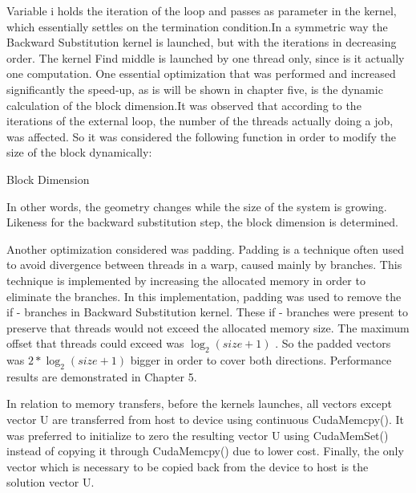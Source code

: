 Variable i holds the iteration of the loop and passes as parameter in the kernel, which essentially settles on the termination condition.In a symmetric way the  Backward Substitution kernel is launched, but with the iterations in decreasing order.
The kernel Find middle is launched by one thread only, since is it actually one computation.
One essential optimization that was performed and increased significantly the speed-up, as is will be shown in chapter five, is the dynamic calculation of the block dimension.It was observed that according to the iterations of the external loop, the number of the threads actually doing a job, was affected. So it was considered the following function in order to modify the size of the block dynamically:
\begin{algorithm}[H]
\begin{algorithmic}[1]
\EndFunction
\end{algorithmic}
\caption{Block Dimension}
\label{alg:calc_dim}
\end{algorithm}
In other words, the geometry changes while the size of the system is growing. 
Likeness for the backward substitution step, the block dimension is determined.

Another optimization considered was padding. Padding is a technique often used to avoid divergence between threads in a warp, caused mainly by branches. This technique is implemented by increasing the allocated memory in order to eliminate the branches.
In this implementation, padding was used to remove the if - branches in Backward Substitution kernel. These if - branches were present to preserve that threads would not exceed the allocated memory size. The maximum offset that threads could exceed was $\log_2(size+1)$ . So the padded vectors was $2*\log_2(size+1)$ bigger in order to cover both directions.
Performance results are demonstrated in Chapter 5.

In relation to memory transfers, before the kernels launches, all vectors except vector U are transferred from host to device using continuous CudaMemcpy(). It was preferred to initialize to zero the resulting vector U using CudaMemSet() instead of copying it through CudaMemcpy() due to lower cost. Finally, the only vector which is necessary to be copied back from the device to host is the solution vector U.
